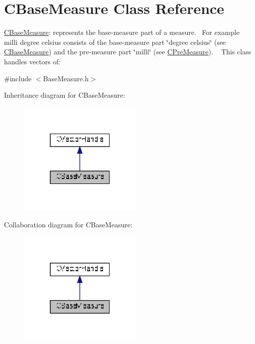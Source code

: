 \hypertarget{classCBaseMeasure}{}\section{C\+Base\+Measure Class Reference}
\label{classCBaseMeasure}


\hyperlink{classCBaseMeasure}{C\+Base\+Measure}\+: represents the base-\/measure part of a measure.~\newline
 For example milli degree celsius consists of the base-\/measure part \char`\"{}degree celsius\char`\"{} (see \hyperlink{classCBaseMeasure}{C\+Base\+Measure}) and the pre-\/measure part \char`\"{}milli\char`\"{} (see \hyperlink{classCPreMeasure}{C\+Pre\+Measure}). ~\newline
 This class handles vectors of\+:  




{\ttfamily \#include $<$Base\+Measure.\+h$>$}



Inheritance diagram for C\+Base\+Measure\+:
\nopagebreak
\begin{figure}[H]
\begin{center}
\leavevmode
\includegraphics[width=169pt]{d6/d40/classCBaseMeasure__inherit__graph}
\end{center}
\end{figure}


Collaboration diagram for C\+Base\+Measure\+:
\nopagebreak
\begin{figure}[H]
\begin{center}
\leavevmode
\includegraphics[width=169pt]{de/d06/classCBaseMeasure__coll__graph}
\end{center}
\end{figure}
